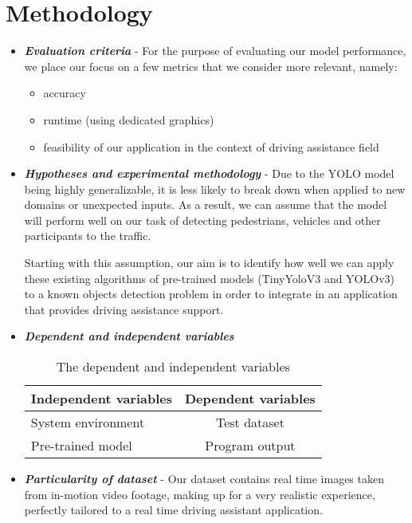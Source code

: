 \documentclass[runningheads,a4paper,11pt]{report}
\begin{document}
\section{Methodology}
\label{section:methodology}

\begin{itemize}
	\item \textbf{\emph{Evaluation criteria}} -
	For the purpose of evaluating our model performance, we place our focus on a few metrics that we consider more relevant, namely:
	\begin{itemize}
	    \item accuracy
	    \item runtime (using dedicated graphics)
	    \item feasibility of our application in the context of driving assistance field
	\end{itemize}
	\item \textbf{\emph{Hypotheses and experimental methodology}} - 
	Due to the YOLO model being highly generalizable, it is less likely to break down when applied to new domains or unexpected inputs. As a result, we can assume that the model will perform well on our task of detecting pedestrians, vehicles and other participants to the traffic.
	
	Starting with this assumption, our aim is to identify how well we can apply these existing algorithms of pre-trained models (TinyYoloV3 and YOLOv3) to a known objects detection problem in order to integrate in an application that provides driving assistance support.
	\item \textbf{\emph{Dependent and independent variables}} 
	\begin{table}[htbp]
	\label{tabVariables}
		\begin{center}
			\begin{tabular}{p{220pt}c}

				\textbf{Independent variables}& \textbf{Dependent variables} \\
				\hline\hline
 				System environment& Test dataset \\
 				Pre-trained model& Program output \\
			\end{tabular}
		\end{center}
		\caption{The dependent and independent variables}
\end{table}
	\item \textbf{\emph{Particularity of dataset}} - Our dataset contains real time images taken from in-motion video footage, making up for a very realistic experience, perfectly tailored to a real time driving assistant application. 
\end{itemize}
\end{document}
